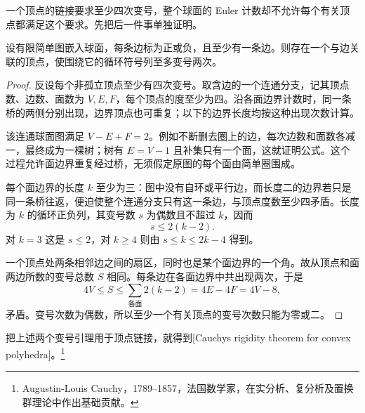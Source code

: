 一个顶点的链接要求至少四次变号，整个球面的 Euler 计数却不允许每个有关顶点都满足这个要求。先把后一件事单独证明。

\begin{lemma}\label{g1:lem:spherical-graph-sign-count}
	设有限简单图嵌入球面，每条边标为正或负，且至少有一条边。则存在一个与边关联的顶点，使围绕它的循环符号列至多变号两次。
\end{lemma}
\begin{proof}
	反设每个非孤立顶点至少有四次变号。取含边的一个连通分支，记其顶点数、边数、面数为 \(V,E,F\)，每个顶点的度至少为四。沿各面边界计数时，同一条桥的两侧分别出现，边界顶点也可重复；以下的边界长度均按这种出现次数计算。

	该连通球面图满足 \(V-E+F=2\)。例如不断删去圈上的边，每次边数和面数各减一，最终成为一棵树；树有 \(E=V-1\) 且补集只有一个面，这就证明公式。这个过程允许面边界重复经过桥，无须假定原图的每个面由简单圈围成。

	每个面边界的长度 \(k\) 至少为三：图中没有自环或平行边，而长度二的边界若只是同一条桥往返，便迫使整个连通分支只有这一条边，与顶点度数至少四矛盾。长度为 \(k\) 的循环正负列，其变号数 \(s\) 为偶数且不超过 \(k\)，因而
	\[
		s\le2(k-2).
	\]
	对 \(k=3\) 这是 \(s\le2\)，对 \(k\ge4\) 则由 \(s\le k\le2k-4\) 得到。

	一个顶点处两条相邻边之间的扇区，同时也是某个面边界的一个角。故从顶点和面两边所数的变号总数 \(S\) 相同。每条边在各面边界中共出现两次，于是
	\[
		4V\le S\le\sum_{\text{各面}}2(k-2)=4E-4F=4V-8,
	\]
	矛盾。变号次数为偶数，所以至少一个有关顶点的变号次数只能为零或二。
\end{proof}

把上述两个变号引理用于顶点链接，就得到[Cauchy\textquotesingle s rigidity theorem for convex polyhedra]。\footnote{Augustin-Louis Cauchy，1789--1857，法国数学家，在实分析、复分析及置换群理论中作出基础贡献。}

